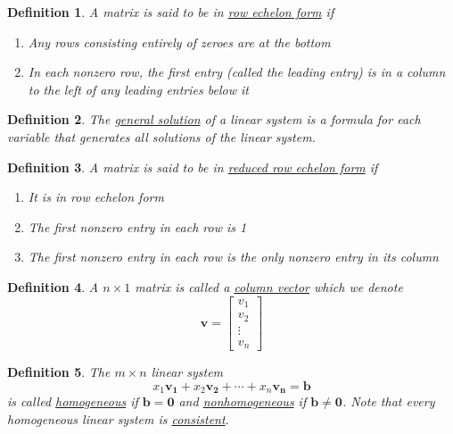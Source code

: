 \documentclass{article}
\theoremstyle{definitionstyle}
\newtheorem{definition}{Definition}[section]
\begin{document}
\begin{definition}
    A matrix is said to be in \underline{row echelon form} if 
    \begin{enumerate}
        \item Any rows consisting entirely of zeroes are at the bottom
        \item In each nonzero row, the first entry (called the leading entry) is in a column to 
        the left of any leading entries below it
    \end{enumerate}
\end{definition}

\begin{definition}
    The \underline{general solution} of a linear system is a formula for each variable that generates
    \textit{all solutions} of the linear system.
\end{definition}

\begin{definition}
    A matrix is said to be in \underline{reduced row echelon form} if 
    \begin{enumerate}
        \item It is in row echelon form
        \item The first nonzero entry in each row is 1
        \item The first nonzero entry in each row is the only nonzero entry in its column
    \end{enumerate}
\end{definition}

\newpage

\begin{definition}
    A $n \times 1$ matrix is called a \underline{column vector} which we denote 
    \begin{equation*}
        \mathbf{v}=\begin{bmatrix}
            v_1 \\
            v_2 \\
            \vdots \\
            v_n
            \end{bmatrix}
    \end{equation*}
\end{definition}

\begin{definition}
    The $m \times n$ linear system
    \begin{equation*}
        x_1 \mathbf{v_1} + x_2 \mathbf{v_2} + \cdots + x_n \mathbf{v _n} = \mathbf{b}
    \end{equation*}
    is called \underline{homogeneous} if $\mathbf{b}=\mathbf{0}$ and \underline{nonhomogeneous} if
    $\mathbf{b} \ne \mathbf{0}$. Note that every homogeneous linear system is \underline{consistent}.
\end{definition}
\end{document}
